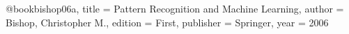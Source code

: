 @book{bishop06a,
  title     = {{P}attern {R}ecognition and {M}achine {L}earning},
  author    = {Bishop, Christopher M.},
  edition   = {First},
  publisher = {Springer},
  year      = {2006}
}
